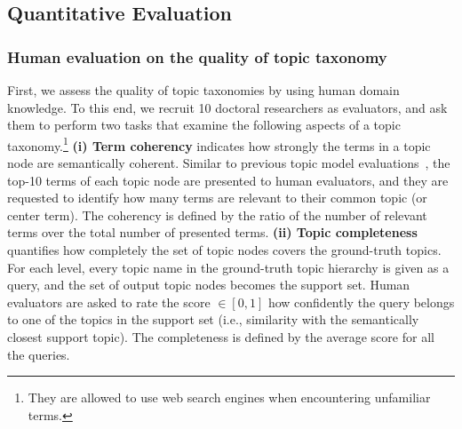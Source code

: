 


\subsection{Quantitative Evaluation}
\label{subsec:doccluster}
\subsubsection{Human evaluation on the quality of topic taxonomy}
\label{subsubsec:humaneval}
First, we assess the quality of topic taxonomies by using human domain knowledge. 
To this end, we recruit 10 doctoral researchers as evaluators, and ask them to perform two tasks that examine the following aspects of a topic taxonomy.\footnote{They are allowed to use web search engines when encountering unfamiliar terms.}
\textbf{(i) Term coherency} indicates how strongly the terms in a topic node are semantically coherent.
Similar to previous topic model evaluations~\cite{xie2015incorporating, shang2020nettaxo}, the top-10 terms of each topic node are presented to human evaluators, and they are requested to identify how many terms are relevant to their common topic (or center term).
The coherency is defined by the ratio of the number of relevant terms over the total number of presented terms.
\textbf{(ii) Topic completeness} quantifies how completely the set of topic nodes covers the ground-truth topics.
For each level, every topic name in the ground-truth topic hierarchy is given as a query, and the set of output topic nodes becomes the support set. 
Human evaluators are asked to rate the score $\in[0,1]$ how confidently the query belongs to one of the topics in the support set (i.e., similarity with the semantically closest support topic).
The completeness is defined by the average score for all the queries. 


